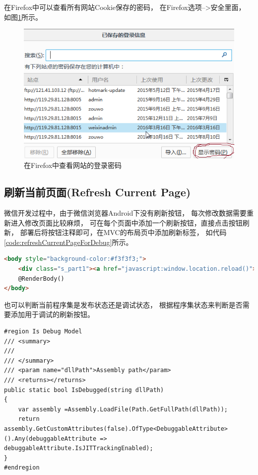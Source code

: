 \documentclass{book}
\begin{document}
在Firefox中可以查看所有网站Cookie保存的密码，
在Firefox选项-->安全里面，
如图\ref{fig:firefoxBrowserPassword}所示。

\begin{figure}[htbp]
	\centering
	\includegraphics[scale=0.8]{firefoxBrowserPassword.png}
	\caption{在Firefox中查看网站的登录密码}
	\label{fig:firefoxBrowserPassword}
\end{figure}

\subsection{刷新当前页面(Refresh Current Page)}

微信开发过程中，由于微信浏览器Android下没有刷新按钮，
每次修改数据需要重新进入修改页面比较麻烦，
可在每个页面中添加一个刷新按钮，直接点击按钮刷新，
部署后将按钮注释即可，在MVC的布局页中添加刷新标签，
如代码\ref{code:refreshCurrentPageForDebug}所示。

\begin{lstlisting}[language=HTML,caption=添加刷新按钮便于调试,label={code:refreshCurrentPageForDebug}]
<body style="background-color:#f3f3f3;">
    <div class="s_part1"><a href="javascript:window.location.reload()">Refresh</a></div>
    @RenderBody()
</body>
\end{lstlisting}

也可以判断当前程序集是发布状态还是调试状态，
根据程序集状态来判断是否需要添加用于调试的刷新按钮。

\begin{lstlisting}[language={[Sharp]C},caption=获取程序集是否为调试状态]
#region Is Debug Model
/// <summary>
/// 
/// </summary>
/// <param name="dllPath">Assembly path</param>
/// <returns></returns>
public static bool IsDebugged(string dllPath)
{
    var assembly =Assembly.LoadFile(Path.GetFullPath(dllPath));
    return assembly.GetCustomAttributes(false).OfType<DebuggableAttribute>().Any(debuggableAttribute => debuggableAttribute.IsJITTrackingEnabled);
}
#endregion
\end{lstlisting}
\end{document}
